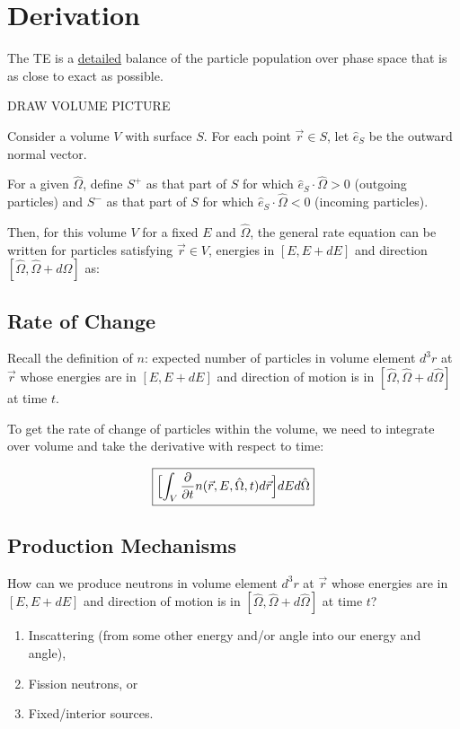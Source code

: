 \documentclass[12pt]{article}
\newcommand{\vOmega}{\ensuremath{\hat{\Omega}}}
\begin{document}
\section*{Derivation}
The TE is a \underline{detailed} balance of the particle population over phase space that is as close to exact as possible. 

DRAW VOLUME PICTURE

Consider a volume $V$ with surface $S$. For each point $\vec{r} \in S$, let $\hat{e}_S$ be the outward normal vector.

For a given $\vOmega$, define $S^+$ as that part of $S$ for which $\hat{e}_S \cdot \vOmega > 0$ (outgoing particles) and $S^-$ as that part of $S$ for which $\hat{e}_S \cdot \vOmega < 0$ (incoming particles).

Then, for this volume $V$ for a fixed $E$ and $\vOmega$, the general rate equation can be written for particles satisfying $\vec{r} \in V$, energies in $[E, E+dE]$ and direction $[\vOmega, \vOmega + d\vOmega]$ as:

\hspace*{3 em} 

\subsection*{Rate of Change}
Recall the definition of $n$: expected number of particles in volume element $d^3r$ at $\vec{r}$ whose energies are in $[E, E + dE]$ and direction of motion is in $[\vOmega, \vOmega + d\vOmega]$ at time $t$.

To get the rate of change of particles within the volume, we need to integrate over volume and take the derivative with respect to time:

\[\boxed{\Bigl[ \int_V \frac{\partial}{\partial t} n(\vec{r}, E, \vOmega, t) d\vec{r} \Bigr] dE d\vOmega }\]


\subsection*{Production Mechanisms}
How can we produce neutrons in volume element $d^3r$ at $\vec{r}$ whose energies are in $[E, E + dE]$ and direction of motion is in $[\vOmega, \vOmega + d\vOmega]$ at time $t$?
%
\begin{enumerate}
\item Inscattering (from some other energy and/or angle into our energy and angle),
\item Fission neutrons, or
\item Fixed/interior sources.
\end{enumerate}
\end{document}
